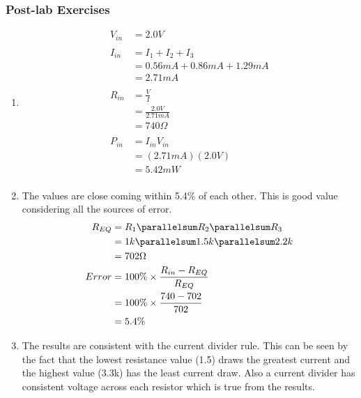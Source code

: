 {{{{{\subsubsection{Post-lab Exercises}
\begin{enumerate}
  \item \begin{equation}
    \begin{aligned}
      V_{in} & = 2.0 V\\ \\
      I_{in} & = I_{1}+I_{2}+I_{3}\\
      & = 0.56 mA + 0.86 mA + 1.29 mA\\
      & = 2.71 mA\\ \\
      R_{in} & = \frac{V}{I}\\
      & = \frac{2.0 V}{2.71 mA}\\
      & =  740 \Omega\\ \\
      P_{in} & = I_{in} V_{in}\\
      & = (2.71 mA)(2.0 V)\\
      & =  5.42 mW\\
    \end{aligned}
  \end{equation}
  \item The values are close coming within 5.4\% of each other.
  This is good value considering all the sources of error.
  \begin{equation}
    \begin{aligned}
      R_{EQ} & = R_1 \parallelsum R_2 \parallelsum R_3 \\
      & = 1k \parallelsum 1.5k \parallelsum 2.2k \\
      & = 702 \Omega \\
      Error &= 100\% \times \frac{R_{in} - R_{EQ}}{R_{EQ}}\\
      &=  100\% \times \frac{740 - 702}{702}\\
      &= 5.4\%\\
    \end{aligned}
  \end{equation}
  \item The results are consistent with the current divider rule. This can be
  seen by the fact that the lowest resistance value (1.5) draws the greatest current
  and the highest value (3.3k) has the least current draw. Also a current divider
  has consistent voltage across each resistor which is true from the results.

\end{enumerate}}}}}}
